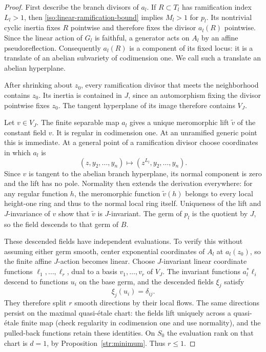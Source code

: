 \begin{proof}
First describe the branch divisors of \(a_l\).
If \(R\subset T_l\) has ramification index \(L_l>1\), then
\eqref{iso:linear-ramification-bound} implies \(M_l>1\) for \(p_l\).
Its nontrivial cyclic inertia fixes \(R\) pointwise and therefore
fixes the divisor \(a_l(R)\) pointwise.
Since the linear action of \(G_l\) is faithful, a generator acts
on \(A_l\) by an affine pseudoreflection.
Consequently \(a_l(R)\) is a component of its fixed locus:
it is a translate of an abelian subvariety of codimension one.
We call such a translate an abelian hyperplane.

After shrinking about \(z_0\), every ramification divisor that meets
the neighborhood contains \(z_0\).
Its inertia is contained in \(J\), since an automorphism fixing
the divisor pointwise fixes \(z_0\).
The tangent hyperplane of its image therefore contains \(V_J\).

Let \(v\in V_J\).
The finite separable map \(a_l\) gives a unique meromorphic lift
\(\widetilde v\) of the constant field \(v\).
It is regular in codimension one.
At an unramified generic point this is immediate.
At a general point of a ramification divisor choose coordinates
in which \(a_l\) is
\[
        (z,y_2,\ldots,y_n)\longmapsto
                     (z^{L_l},y_2,\ldots,y_n).
\]
Since \(v\) is tangent to the abelian branch hyperplane, its normal
component is zero and the lift has no pole.
Normality then extends the derivation everywhere: for any regular
function \(h\), the meromorphic function \(\widetilde v(h)\)
belongs to every local height-one ring and thus to the normal
local ring itself.
Uniqueness of the lift and \(J\)-invariance of \(v\) show that
\(\widetilde v\) is \(J\)-invariant.
The germ of \(p_l\) is the quotient by \(J\), so the field descends
to that germ of \(B\).

These descended fields have independent evaluations.
To verify this without assuming either germ smooth, center
exponential coordinates of \(A_l\) at \(a_l(z_0)\), so the finite
affine \(J\)-action becomes linear.
Choose \(J\)-invariant linear coordinate functions
\(\ell_1,\ldots,\ell_r\), dual to a basis
\(v_1,\ldots,v_r\) of \(V_J\).
The invariant functions \(a_l^*\ell_i\) descend to functions
\(u_i\) on the base germ, and the descended fields \(\xi_j\) satisfy
\[
                              \xi_j(u_i)=\delta_{ij}.
\]
They therefore split \(r\) smooth directions by their local flows.
The same directions persist on the maximal quasi-\'etale chart:
the fields lift uniquely across a quasi-\'etale finite map
(check regularity in codimension one and use normality), and
the pulled-back functions retain these identities.
On \(S_0\) the evaluation rank on that chart is \(d=1\), by
Proposition~\ref{str:minimum}.  Thus \(r\le1\).
\end{proof}

